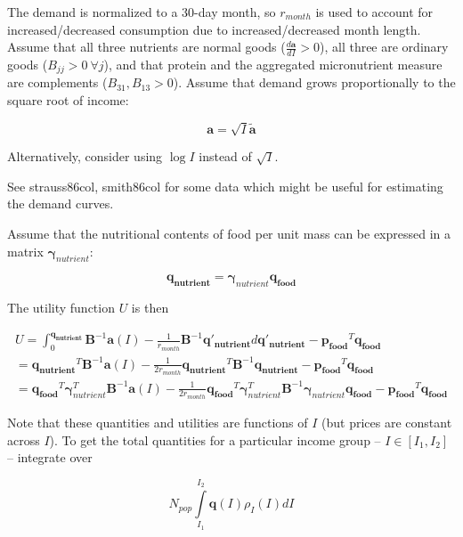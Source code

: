 \documentclass[letter,12pt]{article}
\begin{document}
The demand is normalized to a 30-day month, so $r_{month}$ is used to account for increased/decreased consumption due to increased/decreased month length.  Assume that all three nutrients are normal goods ($\frac{d \mathbf{a}}{d I} > 0$), all three are ordinary goods ($B_{jj} > 0 \ \forall j$), and that protein and the aggregated micronutrient measure are complements ($B_{31},B_{13} > 0$).  Assume that demand grows proportionally to the square root of income:

\begin{equation}
\mathbf{a} = \sqrt{I} \tilde{\mathbf{a}}
\end{equation}

Alternatively, consider using $\log I$ instead of $\sqrt{I}$.

See strauss86col, smith86col for some data which might be useful for estimating the demand curves.

Assume that the nutritional contents of food per unit mass can be expressed in a matrix $\boldsymbol \gamma_{nutrient}$:

\begin{equation}
\mathbf{q_{nutrient}} = \boldsymbol \gamma_{nutrient} \mathbf{q_{food}}
\end{equation}

The utility function $U$ is then

\begin{align}
U = \int_0^{\mathbf{q_{nutrient}}} \mathbf{B}^{-1} \mathbf{a} \left(I\right) - \frac{1}{r_{month}} \mathbf{B}^{-1} \mathbf{q'_{nutrient}} d \mathbf{q'_{nutrient}} - \mathbf{p_{food}}^T \mathbf{q_{food}} \\
= \mathbf{q_{nutrient}}^T \mathbf{B}^{-1} \mathbf{a} \left(I\right) - \frac{1}{2 r_{month}} \mathbf{q_{nutrient}}^T \mathbf{B}^{-1} \mathbf{q_{nutrient}} - \mathbf{p_{food}}^T \mathbf{q_{food}} \\
= \mathbf{q_{food}}^T \boldsymbol \gamma_{nutrient}^T \mathbf{B}^{-1} \mathbf{a} \left(I\right) - \frac{1}{2 r_{month}} \mathbf{q_{food}}^T \boldsymbol \gamma_{nutrient}^T \mathbf{B}^{-1} \boldsymbol \gamma_{nutrient} \mathbf{q_{food}} - \mathbf{p_{food}}^T \mathbf{q_{food}} 
\end{align}

Note that these quantities and utilities are functions of $I$ (but prices are constant across $I$).  To get the total quantities for a particular income group -- $I \in \left[I_1,I_2\right]$ -- integrate over 

\begin{equation}
N_{pop} \int \limits_{I_1}^{I_2} \mathbf{q} \left(I\right) \rho_I \left(I\right) dI
\end{equation}
\end{document}
